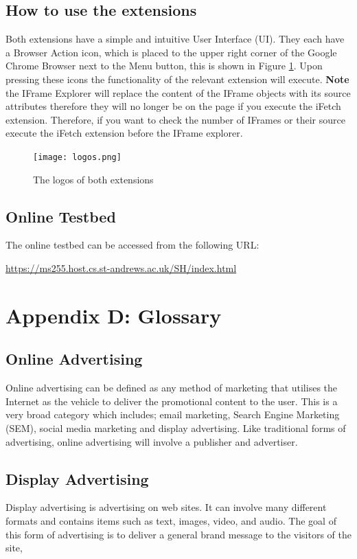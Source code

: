 \documentclass[12pt]{article}
\begin{document}
\subsection{How to use the extensions} \label{userGuide}
Both extensions have a simple and intuitive User Interface (UI). They each have a Browser Action icon, which is placed to the upper right corner of the Google Chrome Browser next to the Menu button, this is shown in Figure \ref{fig:logos}. Upon pressing these icons the functionality of the relevant extension will execute. \textbf{Note} the IFrame Explorer will replace the content of the IFrame objects with its source attributes therefore they will no longer be on the page if you execute the iFetch extension. Therefore, if you want to check the number of IFrames or their source execute the iFetch extension before the IFrame explorer.  

\begin{figure}[H]
    \centering
    \texttt{[image: logos.png]}
    \caption{The logos of both extensions}
    \label{fig:logos}
\end{figure}

\subsection{Online Testbed}
The online testbed can be accessed from the following URL: 
\begin{center}
\url{https://ms255.host.cs.st-andrews.ac.uk/SH/index.html}
\end{center}

\section{Appendix D: Glossary} \label{glossary}

\subsection{Online Advertising}
Online advertising can be defined as any method of marketing that utilises the Internet as the vehicle to deliver the promotional content to the user. This is a very broad category which includes; email marketing, Search Engine Marketing (SEM), social media marketing and display advertising. Like traditional forms of advertising, online advertising will involve a publisher and advertiser. 

\subsection{Display Advertising}
Display advertising is advertising on web sites. It can involve many different formats and contains items such as text, images, video, and audio. The goal of this form of advertising is to deliver a general brand message to the visitors of the site,
\end{document}
